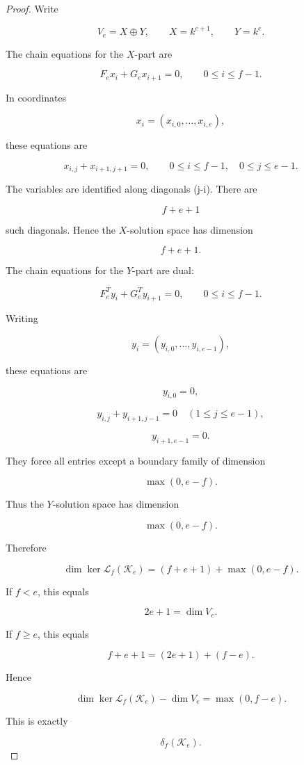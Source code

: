 \documentclass[11pt]{article}
\begin{document}
\begin{proof}

Write

\[
V_e=X\oplus Y,
\qquad
X=k^{e+1},
\qquad
Y=k^e.
\]

The chain equations for the $X$-part are

\[
F_ex_i+G_ex_{i+1}=0,
\qquad
0\le i\le f-1.
\]

In coordinates

\[
x_i=(x_{i,0},\ldots,x_{i,e}),
\]

these equations are

\[
x_{i,j}+x_{i+1,j+1}=0,
\qquad
0\le i\le f-1,\quad 0\le j\le e-1.
\]

The variables are identified along diagonals (j-i). There are

\[
f+e+1
\]

such diagonals. Hence the $X$-solution space has dimension

\[
f+e+1.
\]

The chain equations for the $Y$-part are dual:

\[
F_e^Ty_i+G_e^Ty_{i+1}=0,
\qquad
0\le i\le f-1.
\]

Writing

\[
y_i=(y_{i,0},\ldots,y_{i,e-1}),
\]

these equations are

\[
y_{i,0}=0,
\]

\[
y_{i,j}+y_{i+1,j-1}=0
\quad
(1\le j\le e-1),
\]

\[
y_{i+1,e-1}=0.
\]

They force all entries except a boundary family of dimension

\[
\max(0,e-f).
\]

Thus the $Y$-solution space has dimension

\[
\max(0,e-f).
\]

Therefore

\[
\dim\ker\mathcal L_f(\mathcal K_e)
=
(f+e+1)+\max(0,e-f).
\]

If $f<e$, this equals

\[
2e+1=\dim V_e.
\]

If $f\ge e$, this equals

\[
f+e+1
=
(2e+1)+(f-e).
\]

Hence

\[
\dim\ker\mathcal L_f(\mathcal K_e)-\dim V_e
=
\max(0,f-e).
\]

This is exactly

\[
\delta_f(\mathcal K_e).
\]

\end{proof}
\end{document}
